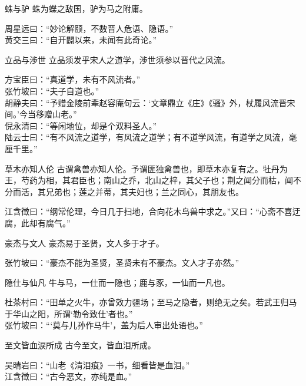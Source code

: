 \begin{yulu}{蛛与驴}
蛛为蝶之敌国，驴为马之附庸。
\begin{comments}
周星远曰：“妙论解颐，不数晋人危语、隐语。” \\
黄交三曰：“自开闢以来，未闻有此奇论。”
\end{comments}
\end{yulu}

\begin{yulu}{立品与渉世}
立品须发乎宋人之道学，渉世须参以晋代之风流。
\begin{comments}
方宝臣曰：“真道学，未有不风流者。” \\
张竹坡曰：“夫子自道也。” \\
胡静夫曰：“予赠金陵前辈赵容庵句云：‘文章鼎立《庄》《骚》外，杖履风流晋宋间。’今当移赠山老。” \\
倪永清曰：“等闲地位，却是个双料圣人。” \\
陆云士曰：“有不风流之道学，有风流之道学；有不道学风流，有道学之风流，毫厘千里。”
\end{comments}
\end{yulu}

\begin{yulu}{草木亦知人伦}
古谓禽兽亦知人伦。予谓匪独禽兽也，即草木亦复有之。牡丹为王，芍药为相，其君臣也；南山之乔，北山之梓，其父子也；荆之闻分而枯，闻不分而活，其兄弟也；莲之并蒂，其夫妇也；兰之同心，其朋友也。
\begin{comments}
江含徵曰：“纲常伦理，今日几于扫地，合向花木鸟兽中求之。”又曰：“心斋不喜迂腐，此却有腐气。”
\end{comments}
\end{yulu}

\begin{yulu}{豪杰与文人}
豪杰易于圣贤，文人多于才子。
\begin{comments}
张竹坡曰：“豪杰不能为圣贤，圣贤未有不豪杰。文人才子亦然。”
\end{comments}
\end{yulu}

\begin{yulu}{隐仕与仙凡}
牛与马，一仕而一隐也；鹿与豕，一仙而一凡也。
\begin{comments}
杜茶村曰：“田单之火牛，亦曾效力疆场；至马之隐者，则绝无之矣。若武王归马于华山之阳，所谓‘勒令致仕’者也。” \\
张竹坡曰：“‘莫与儿孙作马牛’，盖为后人审出处语也。”
\end{comments}
\end{yulu}

\begin{yulu}{至文皆血涙所成}
古今至文，皆血泪所成。
\begin{comments}
吴晴岩曰：“山老《清泪痕》一书，细看皆是血泪。” \\
江含徵曰：“古今恶文，亦纯是血。”
\end{comments}
\end{yulu}


